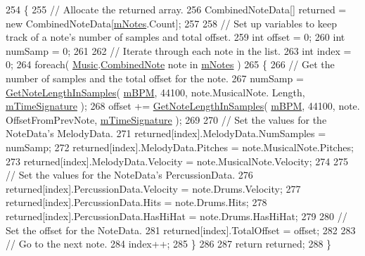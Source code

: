 \begin{DoxyCode}
254     \{
255         \textcolor{comment}{// Allocate the returned array.}
256         CombinedNoteData[] returned = \textcolor{keyword}{new} CombinedNoteData[\hyperlink{group___song_priv_var_ga674bc904a1f856d485d5fb7fe84bac85}{mNotes}.Count];
257 
258         \textcolor{comment}{// Set up variables to keep track of a note's number of samples and total offset.}
259         \textcolor{keywordtype}{int} offset = 0;
260         \textcolor{keywordtype}{int} numSamp = 0;
261 
262         \textcolor{comment}{// Iterate through each note in the list.}
263         \textcolor{keywordtype}{int} index = 0;
264         \textcolor{keywordflow}{foreach}( \hyperlink{class_music}{Music}.\hyperlink{group___music_structs_struct_music_1_1_combined_note}{CombinedNote} note in \hyperlink{group___song_priv_var_ga674bc904a1f856d485d5fb7fe84bac85}{mNotes} )
265         \{
266             \textcolor{comment}{// Get the number of samples and the total offset for the note.}
267             numSamp = \hyperlink{group___song_stat_func_ga03712f6defbff25d5a1cd964e4bc3211}{GetNoteLengthInSamples}( \hyperlink{group___song_priv_var_ga3341fbbd9c0c58fe6514623e6b6c5a1e}{mBPM}, 44100, note.MusicalNote.
      Length, \hyperlink{group___song_priv_var_ga2b2dcc0e83e49f7303b6a1371877b25e}{mTimeSignature} );
268             offset += \hyperlink{group___song_stat_func_ga03712f6defbff25d5a1cd964e4bc3211}{GetNoteLengthInSamples}( \hyperlink{group___song_priv_var_ga3341fbbd9c0c58fe6514623e6b6c5a1e}{mBPM}, 44100, note.
      OffsetFromPrevNote, \hyperlink{group___song_priv_var_ga2b2dcc0e83e49f7303b6a1371877b25e}{mTimeSignature} );
269 
270             \textcolor{comment}{// Set the values for the NoteData's MelodyData.}
271             returned[index].MelodyData.NumSamples = numSamp;
272             returned[index].MelodyData.Pitches = note.MusicalNote.Pitches;
273             returned[index].MelodyData.Velocity = note.MusicalNote.Velocity;
274 
275             \textcolor{comment}{// Set the values for the NoteData's PercussionData.}
276             returned[index].PercussionData.Velocity = note.Drums.Velocity;
277             returned[index].PercussionData.Hits = note.Drums.Hits;
278             returned[index].PercussionData.HasHiHat = note.Drums.HasHiHat;
279 
280             \textcolor{comment}{// Set the offset for the NoteData.}
281             returned[index].TotalOffset = offset;
282 
283             \textcolor{comment}{// Go to the next note.}
284             index++;
285         \}
286 
287         \textcolor{keywordflow}{return} returned;
288     \}
\end{DoxyCode}
\mbox{\label{group___song_pub_func_gad124d0af146885327f8ac455bc013b63}} 
